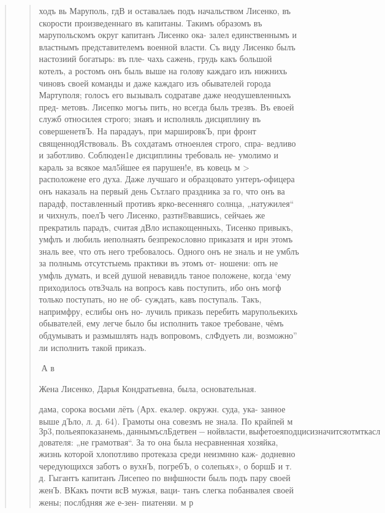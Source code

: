 \begin{quote}
\begin{quote}
ходъ вь Маруполь, гдВ и оставалаеь подъ начальством
Лисенко, въ скорости произведеннаго въ капитаны. Такимъ
образомъ въ марупольскомъ округ капитанъ Лисенко ока-
залел единственнымъ и властнымъ представителемъ военной
власти. Съ виду Лисенко былъ настозиий богатырь: въ пле-
чахь сажень, грудь какъ большой котелъ, а ростомъ онъ
быль выше на голову каждаго изъ нижнихь чиновъ своей
команды и даже каждаго изъ обывателей города Мартуполя;
голосъ его вызывалъ содратаве даже неодушевленныхъ пред-
метовъ. Лисепко могъь пить, но всегда быль трезвъ. Въ евоей
служб относилея строго; знаяъ и исполняль дисциплину
въ совершенетвЪ. На парадауъ, при маршировкЪ, при фронт%
священнодЯствоваль. Въ сохдатамъ отноенлея строго, спра-
ведливо и заботливо. Соблюден1е дисциплины требоваль не-
умолимо и караль за всякое мал5йшее ея парушен!е, въ
ковець м > расположене его духа. Даже лучшаго
и образцовато унтеръ-офицера онъ наказаль на первый день
Сътлаго праздника за го, что онъ ва парадф, поставленный
противъ ярко-весенняго солнца, „натужилея“ и чихнулъ,
поелЪ чего Лисенко, разтн®вавшись, сейчаеь же прекратиль
парадъ, считая дВло испакощенныхь, Тисенко привыкъ, умфлъ
и любиль иеполнаять безпрекословно приказатя и ирн этомъ
зналь вее, что оть него требовалось. Одного онъ не зналь
и не умблъ за полнымь отсутстыемь практики въ этомъ от-
ношени: опъ не умфль думать, и всей душой невавидль
таное положене, когда ‘ему приходилось отвЗчаль на вопросъ
кавь поступить, ибо онъ могф только поступать, но не об-
суждать, кавъ поступаль. Такъ, напримфру, еслибы онъ но-
лучиль приказь перебить марупольекихь обывателей, ему
легче было бы исполнить такое требоване, чёмъ обдумывать
и размышлять надъ вопровомъ, слФдуеть ли, возможно” ли
исполнить такой приказъ.

А в

Жена Лисенко, Дарья Кондратьевна, была, основательная.

дама, сорока восьми лёть (Арх. екалер. окружн. суда, ука-
занное выше дЪло, л. д. 64). Грамоты она совезмъ не знала.
По крайпей м$Зр3, поль ея показанемь, даннымъ слБдетвен-
ной власти, выфето ея подциси значится отм тка сл$дователя:
„не грамотвая“. За то она была несравненная хозяйка,
жизнь которой хлопотливо протеказа среди неизмнно каж-
додневно чередующихся заботъ о вухнЪ, погребЪ, о солепьях»,
о боршБ и т. д. Гыгантъ капитанъ Лисепео по внфшности
быль подъ пару своей женЪ. ВКакъ почти всВ мужья, ваци-
танъ слегка побанвалея своей жены; послбдняя же е-зен-
пиатеняи. м р


\end{quote}
\end{quote}
